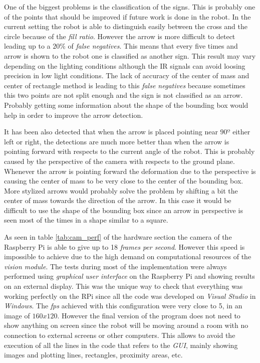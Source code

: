 One of the biggest problems is the classification of the signs. This is probably one of the points that should be improved if future work is done in the robot. In the current setting the robot is able to distinguish easily between the cross and the circle because of the \textit{fill ratio}. However the arrow is more difficult to detect leading up to a $20\%$ of \textit{false negatives}. This means that every five times and arrow is shown to the robot one is classified as another sign. This result may vary depending on the lighting conditions although the IR signals can avoid loosing precision in low light conditions. The lack of accuracy of the center of mass and center of rectangle method is leading to this \textit{false negatives} because sometimes this two points are not split enough and the sign is not classified as an arrow. Probably getting some information about the shape of the bounding box would help in order to improve the arrow detection.

It has been also detected that when the arrow is placed pointing near $90º$ either left or right, the detections are much more better than when the arrow is pointing forward with respects to the current angle of the robot. This is probably caused by the perspective of the camera with respects to the ground plane. Whenever the arrow is pointing forward the deformation due to the perspective is causing the center of mass to be very close to the center of the bounding box. More stylized arrows would probably solve the problem by shifting a bit the center of mass towards the direction of the arrow. In this case it would be difficult to use the shape of the bounding box since an arrow in perspective is seen most of the times in a shape similar to a square.

As seen in table \ref{tab:cam_perf} of the hardware section the camera of the Raspberry Pi is able to give up to 18 \textit{frames per second}. However this speed is impossible to achieve due to the high demand on computational resources of the \textit{vision module}. The tests during most of the implementation were always performed using \textit{graphical user interface} on the Raspberry Pi and showing results on an external display. This was the unique way to check that everything was working perfectly on the RPi since all the code was developed on \textit{Visual Studio} in \textit{Windows}. The \textit{fps} achieved with this configuration were very close to 5, in an image of $160x120$. However the final version of the program does not need to show anything on screen since the robot will be moving around a room with no connection to external screens or other computers. This allows to avoid the execution of all the lines in the code that refers to the \textit{GUI}, mainly showing images and plotting lines, rectangles, proximity areas, etc. 


